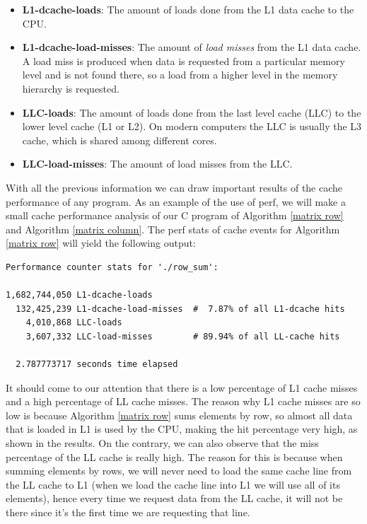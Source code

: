 \documentclass[12pt]{diicc}
\begin{document}
\begin{itemize}
\item \textbf{L1-dcache-loads}: The amount of loads done from the L1 data cache to the CPU.
\item \textbf{L1-dcache-load-misses}: The amount of \textit{load misses} from the L1 data cache. A load miss is produced when data is requested from a particular memory level and is not found there, so a load from a higher level in the memory hierarchy is requested.
\item \textbf{LLC-loads}: The amount of loads done from the last level cache (LLC) to the lower level cache (L1 or L2). On modern computers the LLC is usually the L3 cache, which is shared among different cores.
\item \textbf{LLC-load-misses}: The amount of load misses from the LLC.
\end{itemize}

With all the previous information we can draw important results of the cache performance of any program. As an example of the use of perf, we will make a small cache performance analysis of our C program of Algorithm \ref{matrix row} and Algorithm \ref{matrix column}. The perf stats of cache events for Algorithm \ref{matrix row} will yield the following output:

\begin{verbatim}
Performance counter stats for './row_sum':

1,682,744,050 L1-dcache-loads                                     
  132,425,239 L1-dcache-load-misses  #  7.87% of all L1-dcache hits
    4,010,868 LLC-loads              
    3,607,332 LLC-load-misses        # 89.94% of all LL-cache hits

  2.787773717 seconds time elapsed
\end{verbatim}

It should come to our attention that there is a low percentage of L1 cache misses and a high percentage of LL cache misses. The reason why L1 cache misses are so low is because Algorithm \ref{matrix row} sums elements by row, so almost all data that is loaded in L1 is used by the CPU, making the hit percentage very high, as shown in the results. On the contrary, we can also observe that the miss percentage of the LL cache is really high. The reason for this is because when summing elements by rows, we will never need to load the same cache line from the LL cache to L1 (when we load the cache line into L1 we will use all of its elements), hence every time we request data from the LL cache, it will not be there since it's the first time we are requesting that line.
\end{document}
